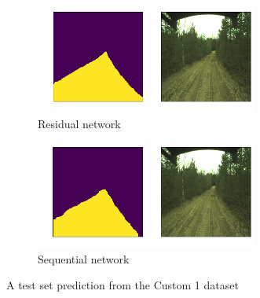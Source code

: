 \documentclass[USenglish]{ifimaster}  %
\begin{document}
\begin{figure}[ht]
\centering
\begin{subfigure}[b]{\textwidth}
\centering
\includegraphics[width=0.8\textwidth]{bilder/custom_1/185_residual.png}
\caption{Residual network}
\label{fig:custom_1_res}
\end{subfigure}
\hfill
\begin{subfigure}[b]{\textwidth}
\centering
\includegraphics[width=0.8\textwidth]{bilder/custom_1/185_sequential.png}
\caption{Sequential network}
\label{fig:custom_1_seq}
\end{subfigure}
\caption{A test set prediction from the Custom 1 dataset}
\end{figure}
\end{document}
